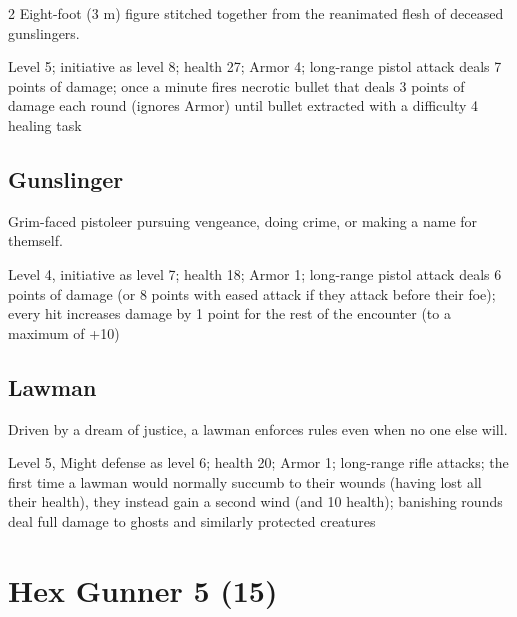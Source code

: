 \begin{multicols}{2}
Eight-foot (3 m) figure stitched together from the reanimated flesh of deceased gunslingers. 

Level 5; initiative as level 8; health 27; Armor 4; long-range pistol attack deals 7 points of damage; once a minute fires necrotic bullet that deals 3 points of damage each round (ignores Armor) until bullet extracted with a difficulty 4 healing task 

\subsection{Gunslinger}

Grim-faced pistoleer pursuing vengeance, doing crime, or making a name for themself. 

Level 4, initiative as level 7; health 18; Armor 1; long-range pistol attack deals 6 points of damage (or 8 points with eased attack if they attack before their foe); every hit increases damage by 1 point for the rest of the encounter (to a maximum of +10) 

\subsection{Lawman}

Driven by a dream of justice, a lawman enforces rules even when no one else will. 

Level 5, Might defense as level 6; health 20; Armor 1; long-range rifle attacks; the first time a lawman would normally succumb to their wounds (having lost all their health), they instead gain a second wind (and 10 health); banishing rounds deal full damage to ghosts and similarly protected creatures

\section{Hex Gunner 5 (15)}


\end{multicols}
